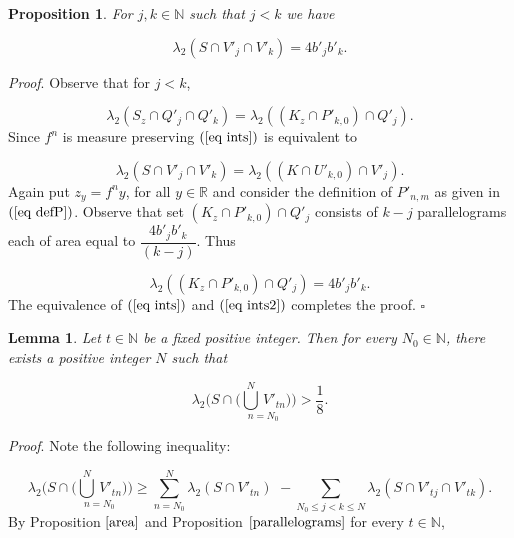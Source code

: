 \documentclass[11pt, english, reqno]{amsart}
\newtheorem{lemma}[theorem]{Lemma}
\newtheorem{proposition}[theorem]{Proposition}
\theoremstyle{definition}
\theoremstyle{remark}
\numberwithin{equation}{section}
\numberwithin{equation}{section}
\begin{document}
\begin{proposition}\label{parallelograms} For $j,k \in \mathbb{N}$ such that  $j<k$ we have 

\begin{equation*}
    \lambda_2 (S \cap V'_j \cap V'_k) = 4 b'_{j} b'_{k}.
\end{equation*}

\end{proposition}

\noindent\textit{Proof}. Observe that for $j < k$,

\begin{equation}\label{eq ints}
 \lambda_2(S_z \cap Q'_j \cap Q'_k) = \lambda_2 ((K_z \cap P'_{k,0})\cap Q'_j).
\end{equation} Since $f^n$ is measure preserving $(\ref{eq ints})$ is equivalent to


\begin{equation}\label{eq ints2}
 \lambda_2 (S \cap V'_j \cap V'_k) = \lambda_2((K \cap U'_{k,0})\cap V'_j). 
\end{equation} Again put $z_y = f^n y$, for all $y \in \mathbb{R}$ and consider the definition of $P'_{n,m}$ as given in $(\ref{eq defP})$. Observe that set $(K_z \cap P'_{k,0})\cap Q'_j$ consists of $k-j$ parallelograms each of area equal to $\dfrac{4b'_j b'_k}{(k-j)}$. Thus 

\begin{equation}
\lambda_2 ((K_z \cap P'_{k,0})\cap Q'_j) = 4 b'_j b'_k.
\end{equation} The equivalence of $(\ref{eq ints})$ and $(\ref{eq ints2})$ completes the proof. \hfill{$\square$} 
\begin{lemma}\label{pos. measure} Let $t \in \mathbb{N}$ be a fixed positive integer. Then for every $N_0 \in \mathbb{N}$, there exists a positive integer $N$ such that 

$$
\lambda_{2}\Big(S \cap \Big( \underset{n=N_0}{\overset{N}{\bigcup} \, V'_{tn}}\Big) \Big) > \frac{1}{8}.
$$

\end{lemma}

\noindent\textit{Proof}. Note the following inequality: 

\begin{equation}
    \lambda_{2}\Big(S \cap \Big( \underset{n=N_0}{\overset{N}{\bigcup} \, V'_{tn}}\Big) \Big) \geq \underset{n=N_0}{\overset{N}{\sum}} \lambda_2 (S \cap V'_{tn}) \,\, - \underset{N_0\leq j < k \leq N}{\sum} \lambda_2 (S \cap V'_{tj} \cap V'_{tk}).
\end{equation} By Proposition $\ref{area}$ and Proposition $\ref{parallelograms}$ for every $t \in \mathbb{N}$, 
\end{document}
